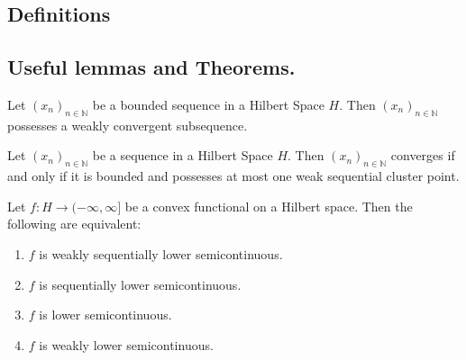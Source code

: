 \subsection{Definitions}
\subsection{Useful lemmas and Theorems.}
\begin{lemma}
	Let $(x_n)_{n \in \mathbb{N}}$ be a bounded sequence in a Hilbert Space $H$. Then $(x_n)_{n \in \mathbb{N}}$ possesses a weakly convergent subsequence.
\end{lemma}

\begin{lemma}
Let $(x_n)_{n \in \mathbb{N}}$ be a sequence in a Hilbert Space $H$. Then $(x_n)_{n \in \mathbb{N}}$ converges if and only if it is bounded and possesses at most one weak sequential cluster point.
\end{lemma}

\begin{theorem} 
	Let $f: H \rightarrow (−\infty, \infty]$ be a convex functional on a Hilbert space. Then the following are equivalent:
	\begin{enumerate}[label=(\roman{*})]
\item 	$f$ is weakly sequentially lower semicontinuous.
\item 	$f$ is sequentially lower semicontinuous.
\item 	$f$ is lower semicontinuous.
\item 	$f$ is weakly lower semicontinuous.
	\end{enumerate}

\end{theorem}